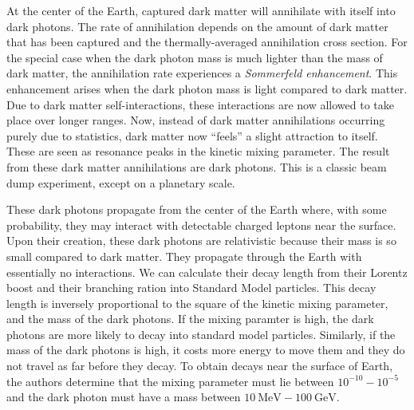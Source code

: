 \documentclass[12pt]{article}
\begin{document}
	
	At the center of the Earth, captured dark matter will annihilate with itself into dark photons. The rate of annihilation depends on the amount of dark matter that has been captured and the thermally-averaged annihilation cross section. For the special case when the dark photon mass is much lighter than the mass of dark matter, the annihilation rate experiences a \emph{Sommerfeld enhancement}. This enhancement arises when the dark photon mass is light compared to dark matter. Due to dark matter self-interactions, these interactions are now allowed to take place over longer ranges. Now, instead of dark matter annihilations occurring purely due to statistics, dark matter now ``feels'' a slight attraction to itself. These are seen as resonance peaks in the kinetic mixing parameter. The result from these dark matter annihilations are dark photons. This is a classic beam dump experiment, except on a planetary scale.
	
	These dark photons propagate from the center of the Earth where, with some probability, they may interact with detectable charged leptons near the surface. Upon their creation, these dark photons are relativistic because their mass is so small compared to dark matter. They propagate through the Earth with essentially no interactions. We can calculate their decay length from their Lorentz boost and their branching ration into Standard Model particles. This decay length is inversely proportional to the square of the kinetic mixing parameter, and the mass of the dark photons. If the mixing paramter is high, the dark photons are more likely to decay into standard model particles. Similarly, if the mass of the dark photons is high, it costs more energy to move them and they do not travel as far before they decay. To obtain decays near the surface of Earth, the authors determine that the mixing parameter must lie between $10^{-10} - 10^{-5}$ and the dark photon must have a mass between $10 \ \text{MeV} - 100 \ \text{GeV}$. 
	
\end{document}

